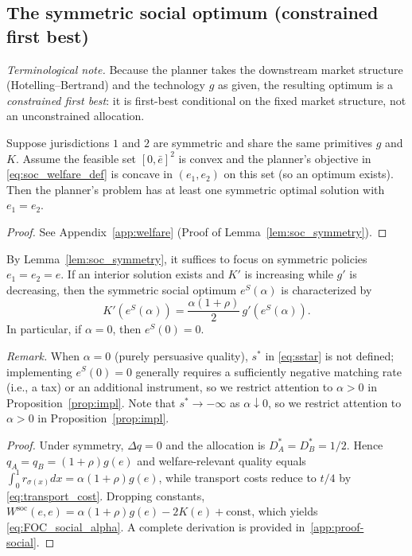 \subsection{The symmetric social optimum (constrained first best)}
\noindent\textit{Terminological note.} Because the planner takes the downstream market structure (Hotelling--Bertrand) and the technology $g$ as given, the resulting optimum is a \emph{constrained first best}: it is first-best conditional on the fixed market structure, not an unconstrained allocation.
\begin{lemma}\label{lem:soc_symmetry}
Suppose jurisdictions $1$ and $2$ are symmetric and share the same primitives $g$ and $K$. Assume the feasible set $[0,\bar e]^2$ is convex and the planner's objective in \eqref{eq:soc_welfare_def} is concave in $(e_1,e_2)$ on this set (so an optimum exists). Then the planner's problem has at least one symmetric optimal solution with $e_1=e_2$.
\end{lemma}

\begin{proof}
See Appendix~\ref{app:welfare} (Proof of Lemma~\ref{lem:soc_symmetry}).
\end{proof}

\begin{proposition}\label{prop:social_alpha}
By Lemma~\ref{lem:soc_symmetry}, it suffices to focus on symmetric policies $e_1=e_2=e$. If an interior solution exists and $K'$ is increasing while $g'$ is decreasing, then the symmetric social optimum $e^{S}(\alpha)$ is characterized by
\begin{equation}\label{eq:FOC_social_alpha}
K'\!\left(e^{S}(\alpha)\right)=\frac{\alpha(1+\rho)}{2}\,g'\!\left(e^{S}(\alpha)\right).
\end{equation}
In particular, if $\alpha=0$, then $e^{S}(0)=0$.
\end{proposition}
\noindent\textit{Remark.} When $\alpha=0$ (purely persuasive quality), $s^{*}$ in \eqref{eq:sstar} is not defined; implementing $e^{S}(0)=0$ generally requires a sufficiently negative matching rate (i.e., a tax) or an additional instrument, so we restrict attention to $\alpha>0$ in Proposition~\ref{prop:impl}. Note that $s^{*}\to -\infty$ as $\alpha\downarrow 0$, so we restrict attention to $\alpha>0$ in Proposition~\ref{prop:impl}.

\begin{proof}
Under symmetry, $\Delta q=0$ and the allocation is $D_A^*=D_B^*=1/2$. Hence $q_A=q_B=(1+\rho)g(e)$ and welfare-relevant quality equals $\int_0^1 r_{\sigma(x)}dx=\alpha(1+\rho)g(e)$, while transport costs reduce to $t/4$ by \eqref{eq:transport_cost}. Dropping constants, $W^{\mathrm{soc}}(e,e)=\alpha(1+\rho)g(e)-2K(e)+\text{const}$, which yields \eqref{eq:FOC_social_alpha}. A complete derivation is provided in~\ref{app:proof-social}.
\end{proof}

